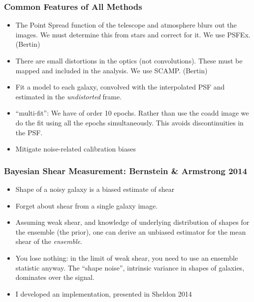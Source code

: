 \documentclass{beamer}
\begin{document}
\frame
{
    \frametitle{Common Features of All Methods}

    \begin{itemize}
        
        \item The Point Spread function of the telescope and atmosphere blurs
            out the images.  We must determine this from stars and correct for it.
            We use PSFEx. (Bertin)
        
        \item There are small distortions in the optics (not convolutions).
            These must be mapped and included in the analysis.
            We use SCAMP. (Bertin)

        \item Fit a model to each galaxy, convolved with the interpolated PSF
            and estimated in the {\it undistorted} frame.

        \item ``multi-fit'': We have of order 10 epochs.  Rather than use the coadd image
            we do the fit using all the epochs simultaneously.  This avoids
            discontinuities in the PSF.

        \item Mitigate noise-related calibration biases

    \end{itemize}
}

\frame
{
    \frametitle{Bayesian Shear Measurement: Bernstein \& Armstrong 2014}

    \begin{itemize}

        \item Shape of a noisy galaxy is a biased estimate of shear

        \item Forget about shear from a single galaxy image.


         \item Assuming weak shear, and knowledge of underlying distribution of
             shapes for the ensemble (the prior), one can derive an unbiased
             estimator for the mean shear of the {\it ensemble}.

         \item You lose nothing: in the limit of weak shear, you need
             to use an ensemble statistic anyway.  The ``shape noise'',
             intrinsic variance in shapes of galaxies, dominates over
             the signal.

        \item I developed an implementation, presented in Sheldon 2014
         
    \end{itemize}

}
\end{document}
